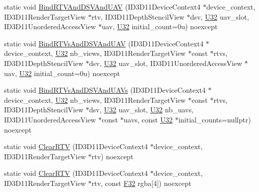 \begin{DoxyCompactItemize}
\item 
static void \hyperlink{structmage_1_1_pipeline_1_1_o_m_a794a33fcdc6c93ad00abe9ba99e5aa08}{Bind\+R\+T\+V\+And\+D\+S\+V\+And\+U\+AV} (I\+D3\+D11\+Device\+Context4 $\ast$device\+\_\+context, I\+D3\+D11\+Render\+Target\+View $\ast$rtv, I\+D3\+D11\+Depth\+Stencil\+View $\ast$dsv, \hyperlink{namespacemage_a41c104c036fba3756a74e19f793eeaa1}{U32} uav\+\_\+slot, I\+D3\+D11\+Unordered\+Access\+View $\ast$uav, \hyperlink{namespacemage_a41c104c036fba3756a74e19f793eeaa1}{U32} initial\+\_\+count=0u) noexcept
\item 
static void \hyperlink{structmage_1_1_pipeline_1_1_o_m_a26a0c8503c2b697dad4d7d8695a41277}{Bind\+R\+T\+Vs\+And\+D\+S\+V\+And\+U\+AV} (I\+D3\+D11\+Device\+Context4 $\ast$device\+\_\+context, \hyperlink{namespacemage_a41c104c036fba3756a74e19f793eeaa1}{U32} nb\+\_\+views, I\+D3\+D11\+Render\+Target\+View $\ast$const $\ast$rtvs, I\+D3\+D11\+Depth\+Stencil\+View $\ast$dsv, \hyperlink{namespacemage_a41c104c036fba3756a74e19f793eeaa1}{U32} uav\+\_\+slot, I\+D3\+D11\+Unordered\+Access\+View $\ast$uav, \hyperlink{namespacemage_a41c104c036fba3756a74e19f793eeaa1}{U32} initial\+\_\+count=0u) noexcept
\item 
static void \hyperlink{structmage_1_1_pipeline_1_1_o_m_a6d5cb6a6e7cefd3c02053933e6c3bfb6}{Bind\+R\+T\+Vs\+And\+D\+S\+V\+And\+U\+A\+Vs} (I\+D3\+D11\+Device\+Context4 $\ast$device\+\_\+context, \hyperlink{namespacemage_a41c104c036fba3756a74e19f793eeaa1}{U32} nb\+\_\+views, I\+D3\+D11\+Render\+Target\+View $\ast$const $\ast$rtvs, I\+D3\+D11\+Depth\+Stencil\+View $\ast$dsv, \hyperlink{namespacemage_a41c104c036fba3756a74e19f793eeaa1}{U32} uav\+\_\+slot, \hyperlink{namespacemage_a41c104c036fba3756a74e19f793eeaa1}{U32} nb\+\_\+uavs, I\+D3\+D11\+Unordered\+Access\+View $\ast$const $\ast$uavs, const \hyperlink{namespacemage_a41c104c036fba3756a74e19f793eeaa1}{U32} $\ast$initial\+\_\+counts=nullptr) noexcept
\item 
static void \hyperlink{structmage_1_1_pipeline_1_1_o_m_aa2383d1a29a34cacbc9fd96f97af31f7}{Clear\+R\+TV} (I\+D3\+D11\+Device\+Context4 $\ast$device\+\_\+context, I\+D3\+D11\+Render\+Target\+View $\ast$rtv) noexcept
\item 
static void \hyperlink{structmage_1_1_pipeline_1_1_o_m_af93a2f44917e3637fcbc471bfe58b401}{Clear\+R\+TV} (I\+D3\+D11\+Device\+Context4 $\ast$device\+\_\+context, I\+D3\+D11\+Render\+Target\+View $\ast$rtv, const \hyperlink{namespacemage_aa97e833b45f06d60a0a9c4fc22ae02c0}{F32} rgba\mbox{[}4\mbox{]}) noexcept
\item 

\end{DoxyCompactItemize}
